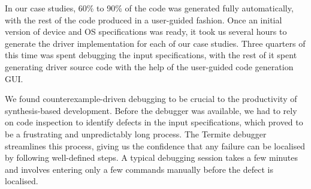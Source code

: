 \documentclass[a4paper,twoside,openright,11pt]{book}
\newcommand{\termite}{Termite\xspace}
\theoremstyle{definition}
\begin{document}
In our case studies, 60\% to 90\% of the code was generated fully automatically, with the rest of the code produced in a user-guided fashion.  Once an initial version of device and OS specifications was ready, it took us several hours to generate the driver implementation for each of our case studies.  Three quarters of this time was spent debugging the input specifications, with the rest of it spent generating driver source code with the help of the user-guided code generation GUI.

We found counterexample-driven debugging to be crucial to the productivity of synthesis-based development.  Before the debugger was available, we had to rely on code inspection to identify defects in the input specifications, which proved to be a frustrating and unpredictably long process.  The \termite debugger streamlines this process, giving us the confidence that any failure can be localised by following well-defined steps.  A typical debugging session takes a few minutes and involves entering only a few commands manually before the defect is localised. 

%
%
%

\end{document}
